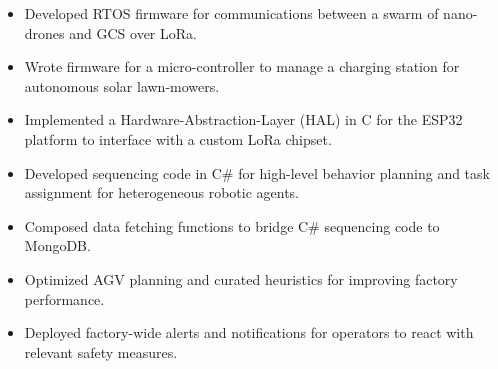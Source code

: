 \documentclass[10pt,a4paper,ragged2e,withhyper]{altacv}
\begin{document}
\begin{paracol}{2}

    \vspace{-1.5em} %
    \begin{itemize}
        \item Developed RTOS firmware for communications between a swarm of nano-drones and GCS over LoRa.
        \item Wrote firmware for a micro-controller to manage a charging station for autonomous solar lawn-mowers.
        \item Implemented a Hardware-Abstraction-Layer (HAL) in C for the ESP32 platform to interface with a custom LoRa chipset.
    \end{itemize}
    \begin{itemize}
        \item Developed sequencing code in C\# for high-level behavior planning and task assignment for heterogeneous robotic agents.
        \item Composed data fetching functions to bridge C\# sequencing code to MongoDB.
        \item Optimized AGV planning and curated heuristics for improving factory performance.
        \item Deployed factory-wide alerts and notifications for operators to react with relevant safety measures.

\end{itemize}
\end{paracol}
\end{document}
